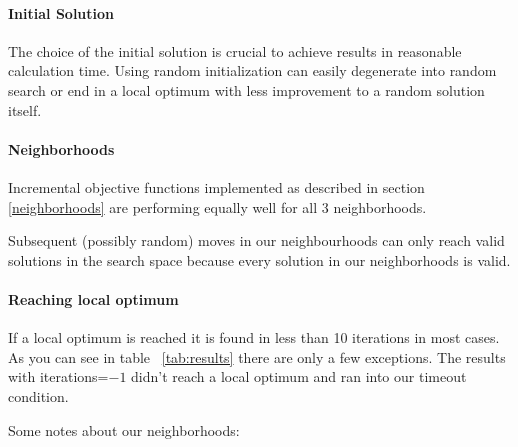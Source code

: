 \documentclass{scrartcl}
\begin{document}
\paragraph{Initial Solution}
The choice of the initial solution is crucial to achieve results in reasonable calculation time.
Using random initialization can easily degenerate into random search or end in a 
local optimum with less improvement to a random solution itself.








\paragraph{Neighborhoods}
Incremental objective functions implemented as described in section \ref{neighborhoods}
are performing equally well for all 3 neighborhoods.

Subsequent (possibly random) moves in our neighbourhoods can only reach
valid solutions in the search space because every solution in our neighborhoods
is valid.

\paragraph{Reaching local optimum}
If a local optimum is reached it is found in less than 10 iterations in most cases.
As you can see in table ~\ref{tab:results} there are only a few exceptions.
The results with iterations=$-1$ didn't reach a local optimum and ran into our
timeout condition.





Some notes about our neighborhoods:
\end{document}
